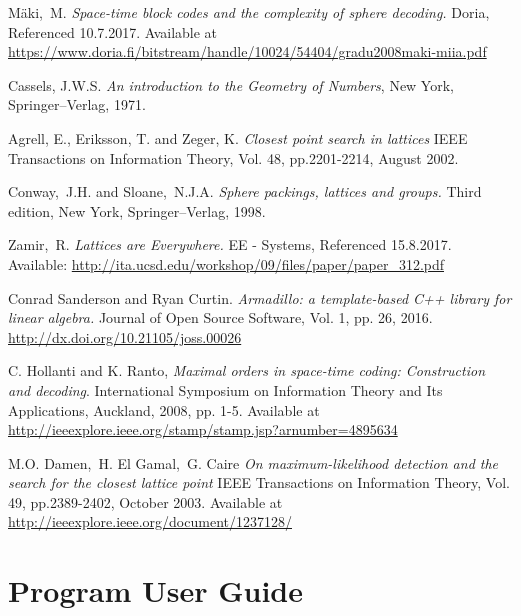 \documentclass[english,12pt,a4paper,pdftex,sci,utf8]{aaltothesis}
\begin{document}
{}
\begin{thebibliography}{99}

 Mäki,\ M. \textit{Space-time block codes and the complexity of sphere decoding.} Doria, Referenced 10.7.2017. Available at
  \url{https://www.doria.fi/bitstream/handle/10024/54404/gradu2008maki-miia.pdf}
   
 Cassels, J.W.S. \textit{An introduction to the Geometry of Numbers}, New York, Springer--Verlag, 1971.

 Agrell, E., Eriksson, T. and Zeger, K. \textit{Closest point search in lattices} IEEE Transactions on Information Theory, Vol. 48, pp.2201-2214,
August 2002.

 Conway,\ J.H. and Sloane,\ N.J.A. \textit{Sphere packings, lattices and groups.} Third edition, New York, Springer--Verlag, 1998.

 Zamir,\ R. \textit{Lattices are Everywhere.} EE - Systems, Referenced 15.8.2017. Available: \url{http://ita.ucsd.edu/workshop/09/files/paper/paper_312.pdf}

 Conrad Sanderson and Ryan Curtin.
\textit{Armadillo: a template-based C++ library for linear algebra.}
Journal of Open Source Software, Vol. 1, pp. 26, 2016.
\url{http://dx.doi.org/10.21105/joss.00026}

 C. Hollanti and K. Ranto, \textit{Maximal orders in space-time coding: Construction and decoding}. International Symposium on Information Theory and Its Applications, Auckland, 2008, pp. 1-5. Available at \url{http://ieeexplore.ieee.org/stamp/stamp.jsp?arnumber=4895634}

 M.O. Damen,\ H. El Gamal,\ G. Caire \emph{On maximum-likelihood detection and the search for the closest lattice point} IEEE Transactions on Information Theory, Vol. 49, pp.2389-2402, October 2003. Available at \url{http://ieeexplore.ieee.org/document/1237128/}



\end{thebibliography}

\clearpage

\thesisappendix

\section{Program User Guide}
\end{document}
